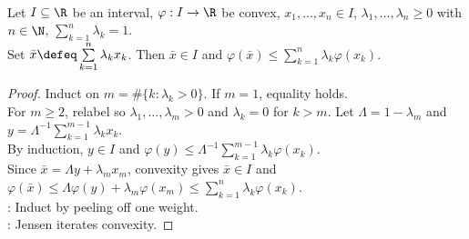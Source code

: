 \begin{proposition} \label{prop:finite-jensen-inequality} \\
Let $I\subseteq\R$ be an interval, $\varphi:I\to\R$ be convex, $x_1,\ldots,x_n\in I$, $\lambda_1,\ldots,\lambda_n\geq0$ with $n\in\N$, $\sum\limits_{k=1}^{n}\lambda_k=1$.\\
Set $\bar{x}\defeq\sum\limits_{k=1}^{n}\lambda_kx_k$. Then $\bar{x}\in I$ and $\varphi(\bar{x})\leq\sum\limits_{k=1}^{n}\lambda_k\varphi(x_k)$.
\begin{proof} Induct on $m=\#\{k:\lambda_k>0\}$. If $m=1$, equality holds.\\
For $m\geq2$, relabel so $\lambda_1,\ldots,\lambda_m>0$ and $\lambda_k=0$ for $k>m$. Let $\Lambda=1-\lambda_m$ and $y=\Lambda^{-1}\sum\limits_{k=1}^{m-1}\lambda_kx_k$.\\
By induction, $y\in I$ and $\varphi(y)\leq\Lambda^{-1}\sum\limits_{k=1}^{m-1}\lambda_k\varphi(x_k)$.\\
Since $\bar{x}=\Lambda y+\lambda_mx_m$, convexity gives $\bar{x}\in I$ and $\varphi(\bar{x})\leq\Lambda\varphi(y)+\lambda_m\varphi(x_m)\leq\sum\limits_{k=1}^{n}\lambda_k\varphi(x_k)$.\\
: Induct by peeling off one weight.\\
: Jensen iterates convexity.
\end{proof}
\end{proposition}

